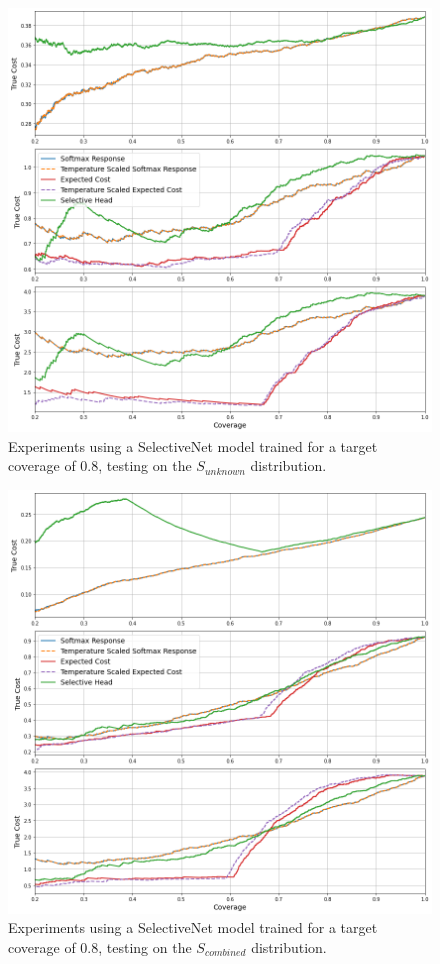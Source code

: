 \begin{figure}[H]
	\includegraphics[width=\textwidth]{images/binary/sn0.8_out_distribution.png}
	\caption*{Experiments using a SelectiveNet model trained for a target coverage of 0.8, testing on the $S_{unknown}$ distribution.}
\end{figure}

\begin{figure}[H]
	\includegraphics[width=\textwidth]{images/binary/sn0.8_combine_distribution.png}
	\caption*{Experiments using a SelectiveNet model trained for a target coverage of 0.8, testing on the $S_{combined}$ distribution.}
\end{figure}

